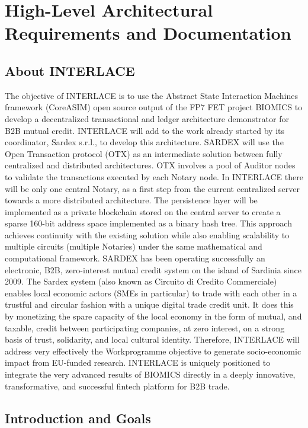 \chapter{High-Level Architectural Requirements and Documentation}
\label{ch:archreq}
\section{\textbf{About INTERLACE}}

The objective of INTERLACE is to use the Abstract State Interaction Machines framework (CoreASIM) open source output of the FP7 FET project BIOMICS to develop a decentralized transactional and ledger architecture demonstrator for B2B mutual credit. INTERLACE will add to the work already started by its coordinator, Sardex s.r.l., to develop this architecture.
SARDEX will use the Open Transaction protocol (OTX) as an intermediate solution between fully centralized and distributed architectures. OTX involves a pool of Auditor nodes to validate the transactions executed by each Notary node. In INTERLACE there will be only one central Notary, as a first step from the current centralized server towards a more distributed architecture. The persistence layer will be implemented as a private blockchain stored on the central server to create a sparse 160-bit address space implemented as a binary hash tree. This approach achieves continuity with the
existing solution while also enabling scalability to multiple circuits (multiple Notaries) under the same mathematical and computational framework. SARDEX has been operating successfully an electronic, B2B, zero-interest mutual credit system on the island of Sardinia since 2009. The Sardex system (also known as Circuito di Credito Commerciale) enables local economic actors (SMEs in particular) to trade with each other in a trustful and circular fashion with a unique digital trade credit unit. It does this by monetizing the spare capacity of the local economy in the form of mutual, and taxable, credit between participating companies, at zero interest, on a strong basis of trust, solidarity, and local cultural identity. Therefore, INTERLACE will address very effectively the Workprogramme objective to generate socio-economic impact from EU-funded research. INTERLACE is uniquely positioned to integrate the very advanced results of BIOMICS directly in a deeply innovative, transformative, and successful fintech platform for B2B trade.

\section{Introduction and Goals}\label{section-introduction-and-goals}

